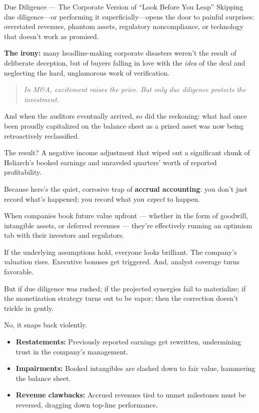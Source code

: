 \begin{HistoricalSidebar}{Due Diligence --- The Corporate Version of ``Look Before You Leap''}
    Skipping due diligence—or performing it superficially—opens the door to painful surprises:  
    overstated revenues, phantom assets, regulatory noncompliance, or technology that doesn’t work as promised.
    
    \medskip
    
    \textbf{The irony:} many headline-making corporate disasters weren’t the result of deliberate deception, but of buyers falling in love with the \textit{idea} of the deal and neglecting the hard, unglamorous work of verification.
    
    \medskip
    
    \begin{quote}
    \textit{In M\&A, excitement raises the price.  
    But only due diligence protects the investment.}
    \end{quote}
    
\end{HistoricalSidebar}

\medskip

And when the auditors eventually arrived, so did the reckoning:
what had once been proudly capitalized on the balance sheet as a prized asset was now being retroactively reclassified.

The result?
A negative income adjustment that wiped out a significant chunk of Heliarch’s booked earnings and unraveled quarters’ worth of reported profitability.

Because here’s the quiet, corrosive trap of \textbf{accrual accounting}:
you don’t just record what’s happened; you record what you \textit{expect} to happen.

When companies book future value upfront --- whether in the form of goodwill, intangible assets, or deferred revenues --- 
they’re effectively running an optimism tab with their investors and regulators.

If the underlying assumptions hold, everyone looks brilliant.
The company’s valuation rises. Executive bonuses get triggered. And, analyst coverage turns favorable.

But if due diligence was rushed; if the projected synergies fail to materialize; if the monetization strategy turns out 
to be vapor; then the correction doesn’t trickle in gently.

No, it snaps back violently.

\begin{itemize}
    \item \textbf{Restatements:} Previously reported earnings get rewritten, undermining trust in the company’s management.
    \item \textbf{Impairments:} Booked intangibles are slashed down to fair value, hammering the balance sheet.
    \item \textbf{Revenue clawbacks:} Accrued revenues tied to unmet milestones must be reversed, dragging down top-line performance.
\end{itemize}


